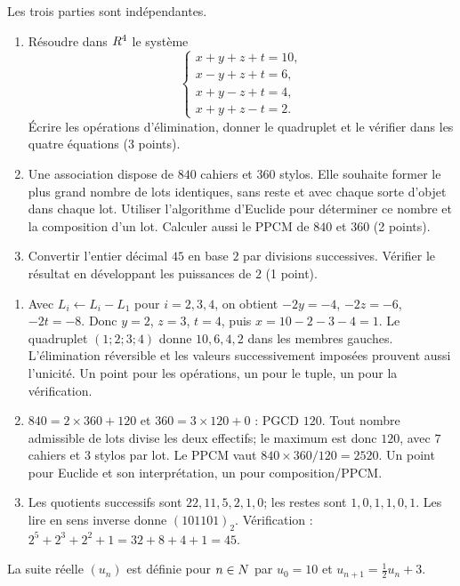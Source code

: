 Les trois parties sont indépendantes.
\begin{enumerate}
\item Résoudre dans $R^4$ le système
\[
\begin{cases}x+y+z+t=10,\\x-y+z+t=6,\\x+y-z+t=4,\\x+y+z-t=2.\end{cases}
\]
Écrire les opérations d’élimination, donner le quadruplet et le vérifier dans les quatre équations (3 points).
\item Une association dispose de $840$ cahiers et $360$ stylos. Elle souhaite former le plus grand nombre de lots identiques, sans reste et avec chaque sorte d’objet dans chaque lot. Utiliser l’algorithme d’Euclide pour déterminer ce nombre et la composition d’un lot. Calculer aussi le PPCM de $840$ et $360$ (2 points).
\item Convertir l’entier décimal $45$ en base $2$ par divisions successives. Vérifier le résultat en développant les puissances de $2$ (1 point).
\end{enumerate}
\begin{corrige}\label{sol-t11s-ds2-e02}
\begin{enumerate}
\item Avec $L_i\leftarrow L_i-L_1$ pour $i=2,3,4$, on obtient $-2y=-4$, $-2z=-6$, $-2t=-8$. Donc $y=2$, $z=3$, $t=4$, puis $x=10-2-3-4=1$. Le quadruplet $(1;2;3;4)$ donne $10,6,4,2$ dans les membres gauches. L’élimination réversible et les valeurs successivement imposées prouvent aussi l’unicité. Un point pour les opérations, un pour le tuple, un pour la vérification.
\item $840=2\times360+120$ et $360=3\times120+0$ : PGCD $120$. Tout nombre admissible de lots divise les deux effectifs; le maximum est donc $120$, avec $7$ cahiers et $3$ stylos par lot. Le PPCM vaut $840\times360/120=2520$. Un point pour Euclide et son interprétation, un pour composition/PPCM.
\item Les quotients successifs sont $22,11,5,2,1,0$; les restes sont $1,0,1,1,0,1$. Les lire en sens inverse donne $(101101)_2$. Vérification : $2^5+2^3+2^2+1=32+8+4+1=45$.
\end{enumerate}
\end{corrige}
\label{t11s-ds2-e03}\par
La suite réelle $(u_n)$ est définie pour $n\in N$ par $u_0=10$ et $u_{n+1}=\frac12u_n+3$.
